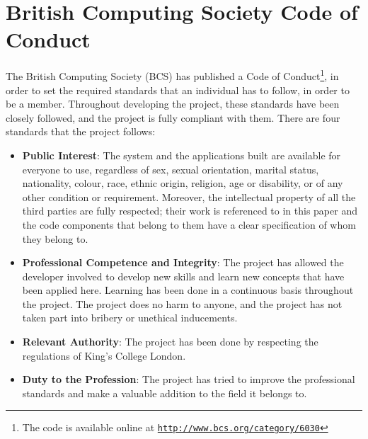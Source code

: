 \section{British Computing Society Code of Conduct}
The British Computing Society (BCS) has published a Code of Conduct\footnote{The code is available online at \texttt{\url{http://www.bcs.org/category/6030}}}, in order to set the required standards that an individual has to follow, in order to be a member. Throughout developing the project, these standards have been closely followed, and the project is fully compliant with them. There are four standards that the project follows:
\begin{itemize}
    \item \textbf{Public Interest}: The system and the applications built are available for everyone to use, regardless of sex, sexual orientation, marital status, nationality, colour, race, ethnic origin, religion, age or disability, or of any other condition or requirement. Moreover, the intellectual property of all the third parties are fully respected; their work is referenced to in this paper and the code components that belong to them have a clear specification of whom they belong to.
    \item \textbf{Professional Competence and Integrity}: The project has allowed the developer involved to develop new skills and learn new concepts that have been applied here. Learning has been done in a continuous basis throughout the project. The project does no harm to anyone, and the project has not taken part into bribery or unethical inducements.
    \item \textbf{Relevant Authority}: The project has been done by respecting the regulations of King's College London.
    \item \textbf{Duty to the Profession}: The project has tried to improve the professional standards and make a valuable addition to the field it belongs to.
\end{itemize}

